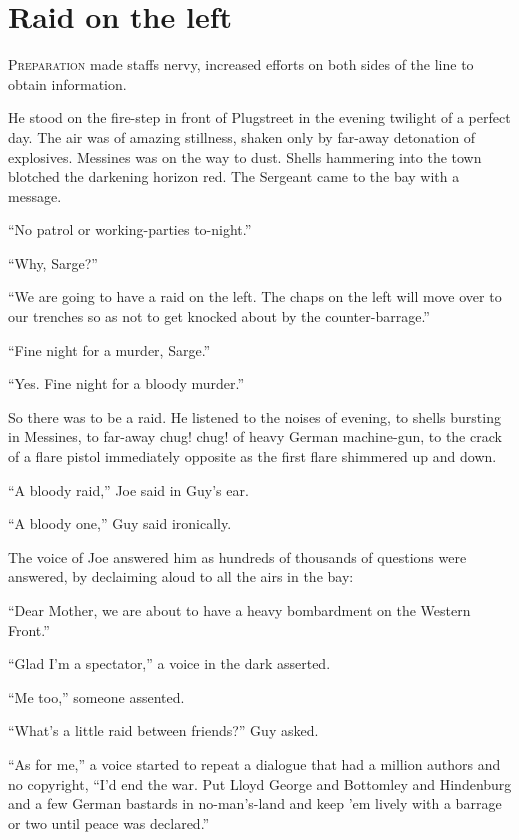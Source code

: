 \chapter*{\textsf{Raid on the left}}

P\textsc{reparation} made staffs nervy, increased efforts on both sides of the line to obtain information.

He stood on the fire-step in front of Plugstreet in the evening twilight of a perfect day. The air was of amazing stillness, shaken only by far-away detonation of explosives. Messines was on the way to dust. Shells hammering into the town blotched the darkening horizon red. The Sergeant came to the bay with a message.

``No patrol or working-parties to-night.''

``Why, Sarge?''

``We are going to have a raid on the left. The chaps on the left will move over to our trenches so as not to get knocked about by the counter-barrage.''

``Fine night for a murder, Sarge.''

``Yes. Fine night for a bloody murder.''

So there was to be a raid. He listened to the noises of evening, to shells bursting in Messines, to far-away chug! chug! of heavy German machine-gun, to the crack of a flare pistol immediately opposite as the first flare shimmered up and down.

``A bloody raid,'' Joe said in Guy's ear.

``A bloody one,'' Guy said ironically.

The voice of Joe answered him as hundreds of thousands of questions were answered, by declaiming aloud to all the airs in the bay:

``Dear Mother, we are about to have a heavy bombardment on the Western Front.''

``Glad I'm a spectator,'' a voice in the dark asserted.

``Me too,'' someone assented.

``What's a little raid between friends?'' Guy asked.

``As for me,'' a voice started to repeat a dialogue that had a million authors and no copyright, ``I'd end the war. Put Lloyd George and Bottomley and Hindenburg and a few German bastards in no-man's-land and keep 'em lively with a barrage or two until peace was declared.''

